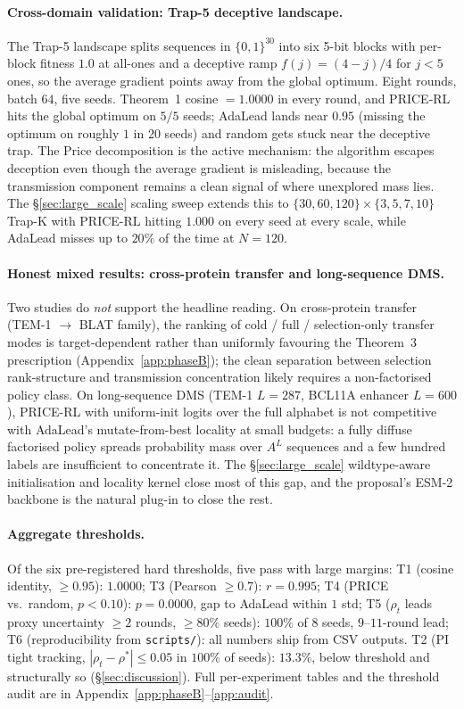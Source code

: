 \paragraph{Cross-domain validation: Trap-5 deceptive landscape.} The Trap-5 landscape \citep{goldberg1989genetic} splits sequences in $\{0,1\}^{30}$ into six 5-bit blocks with per-block fitness $1.0$ at all-ones and a deceptive ramp $f(j) = (4-j)/4$ for $j<5$ ones, so the average gradient points away from the global optimum. Eight rounds, batch $64$, five seeds. Theorem~1 cosine $= 1.0000$ in every round, and PRICE-RL hits the global optimum on $5/5$ seeds; AdaLead lands near $0.95$ (missing the optimum on roughly $1$ in $20$ seeds) and random gets stuck near the deceptive trap. The Price decomposition is the active mechanism: the algorithm escapes deception even though the average gradient is misleading, because the transmission component remains a clean signal of where unexplored mass lies. The §\ref{sec:large_scale} scaling sweep extends this to $\{30,60,120\}\times\{3,5,7,10\}$ Trap-K with PRICE-RL hitting $1.000$ on every seed at every scale, while AdaLead misses up to $20\%$ of the time at $N=120$.

\paragraph{Honest mixed results: cross-protein transfer and long-sequence DMS.} Two studies do \emph{not} support the headline reading. On cross-protein transfer (TEM-1 $\to$ BLAT family), the ranking of cold / full / selection-only transfer modes is target-dependent rather than uniformly favouring the Theorem~3 prescription (Appendix~\ref{app:phaseB}); the clean separation between selection rank-structure and transmission concentration likely requires a non-factorised policy class. On long-sequence DMS (TEM-1 $L=287$, BCL11A enhancer $L=600$), PRICE-RL with uniform-init logits over the full alphabet is not competitive with AdaLead's mutate-from-best locality at small budgets: a fully diffuse factorised policy spreads probability mass over $A^L$ sequences and a few hundred labels are insufficient to concentrate it. The §\ref{sec:large_scale} wildtype-aware initialisation and locality kernel close most of this gap, and the proposal's ESM-2 backbone is the natural plug-in to close the rest.

\paragraph{Aggregate thresholds.} Of the six pre-registered hard thresholds, five pass with large margins: T1 (cosine identity, $\geq 0.95$): $\mathbf{1.0000}$; T3 (Pearson $\geq 0.7$): $r=0.995$; T4 (PRICE vs.\ random, $p<0.10$): $p=0.0000$, gap to AdaLead within $1$ std; T5 ($\rho_t$ leads proxy uncertainty $\geq 2$ rounds, $\geq 80\%$ seeds): $100\%$ of $8$ seeds, $9$--$11$-round lead; T6 (reproducibility from \texttt{scripts/}): all numbers ship from CSV outputs. T2 (PI tight tracking, $|\rho_t-\rho^*|\leq 0.05$ in $100\%$ of seeds): $13.3\%$, below threshold and structurally so (§\ref{sec:discussion}). Full per-experiment tables and the threshold audit are in Appendix~\ref{app:phaseB}--\ref{app:audit}.
